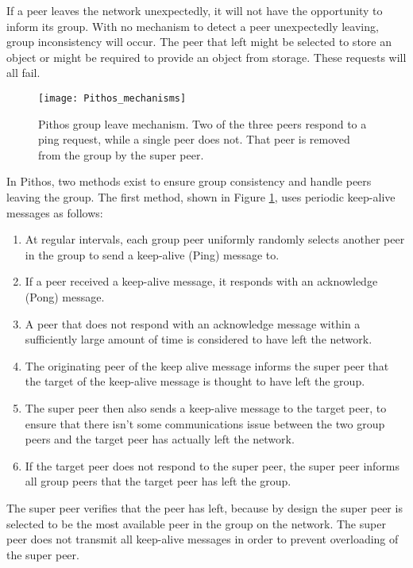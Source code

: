 If a peer leaves the network unexpectedly, it will not have the opportunity to inform its group. With no mechanism to detect a peer unexpectedly leaving, group inconsistency will occur. The peer that left might be selected to store an object or might be required to provide an object from storage. These requests will all fail.

\begin{figure}[htbp]
 \centering
 \texttt{[image: Pithos\_mechanisms]}
 \caption{Pithos group leave mechanism. Two of the three peers respond to a ping request, while a single peer does not. That peer is removed from the group by the super peer.}
 \label{fig_pithos_leave}
\end{figure}

In Pithos, two methods exist to ensure group consistency and handle peers leaving the group. The first method, shown in Figure \ref{fig_pithos_leave}, uses periodic keep-alive messages as follows:
%
\begin{enumerate}
\item At regular intervals, each group peer uniformly randomly selects another peer in the group to send a keep-alive (Ping) message to.

\item If a peer received a keep-alive message, it responds with an acknowledge (Pong) message.

\item A peer that does not respond with an acknowledge message within a sufficiently large amount of time is considered to have left the network.

\item The originating peer of the keep alive message informs the super peer that the target of the keep-alive message is thought to have left the group.

\item The super peer then also sends a keep-alive message to the target peer, to ensure that there isn't some communications issue between the two group peers and the target peer has actually left the network.

\item If the target peer does not respond to the super peer, the super peer informs all group peers that the target peer has left the group.
\end{enumerate}

The super peer verifies that the peer has left, because by design the super peer is selected to be the most available peer in the group on the network. The super peer does not transmit all keep-alive messages in order to prevent overloading of the super peer.

